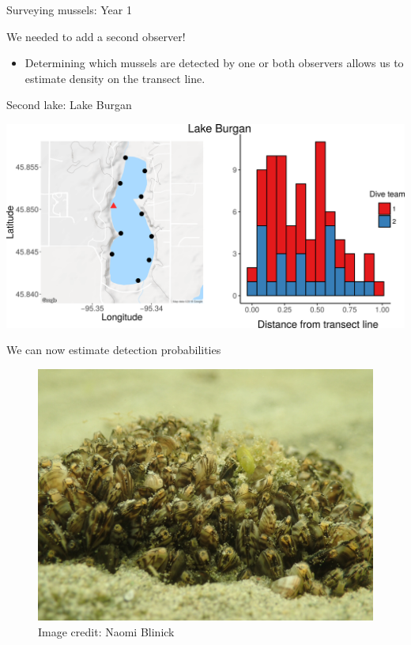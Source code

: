 \documentclass[ignorenonframetext,]{beamer}
\providecommand{\tightlist}{%
  \setlength{\itemsep}{0pt}\setlength{\parskip}{0pt}}
\begin{document}
\begin{frame}{Surveying mussels: Year 1}
\begin{block}{We needed to add a second observer!}
\begin{itemize}
  \begin{itemize}
  \tightlist
  \item
    First diver counts, followed by second diver
  \end{itemize}
\item
  Determining which mussels are detected by one or both observers allows
  us to estimate density on the transect line.
\end{itemize}

\end{block}

\begin{block}{Second lake: Lake Burgan}

\includegraphics[width=0.9\linewidth]{../Figures/BurganSummary}

\end{block}

\begin{block}{We can now estimate detection probabilities}

\begin{figure}

{\centering \includegraphics[width=0.7\linewidth]{../Figures/IMG_2558} 

}

\caption{Image credit: Naomi Blinick}\label{fig:unnamed-chunk-9}
\end{figure}


\end{block}
\end{frame}
\end{document}
